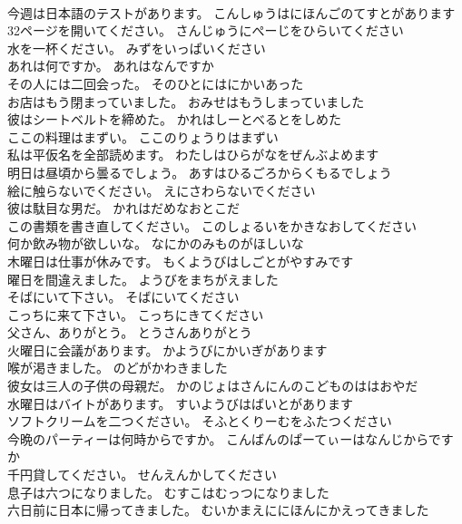 \documentclass[8pt]{extreport}
\begin{document}
\begin{CJK}{UTF8}{min}
\\	今週は日本語のテストがあります。	こんしゅうはにほんごのてすとがあります 
\\	32ページを開いてください。	さんじゅうにぺーじをひらいてください 
\\	水を一杯ください。	みずをいっぱいください 
\\	あれは何ですか。	あれはなんですか 
\\	その人には二回会った。	そのひとにはにかいあった 
\\	お店はもう閉まっていました。	おみせはもうしまっていました 
\\	彼はシートベルトを締めた。	かれはしーとべるとをしめた 
\\	ここの料理はまずい。	ここのりょうりはまずい 
\\	私は平仮名を全部読めます。	わたしはひらがなをぜんぶよめます 
\\	明日は昼頃から曇るでしょう。	あすはひるごろからくもるでしょう 
\\	絵に触らないでください。	えにさわらないでください 
\\	彼は駄目な男だ。	かれはだめなおとこだ 
\\	この書類を書き直してください。	このしょるいをかきなおしてください 
\\	何か飲み物が欲しいな。	なにかのみものがほしいな 
\\	木曜日は仕事が休みです。	もくようびはしごとがやすみです 
\\	曜日を間違えました。	ようびをまちがえました 
\\	そばにいて下さい。	そばにいてください 
\\	こっちに来て下さい。	こっちにきてください 
\\	父さん、ありがとう。	とうさんありがとう 
\\	火曜日に会議があります。	かようびにかいぎがあります 
\\	喉が渇きました。	のどがかわきました 
\\	彼女は三人の子供の母親だ。	かのじょはさんにんのこどものははおやだ 
\\	水曜日はバイトがあります。	すいようびはばいとがあります 
\\	ソフトクリームを二つください。	そふとくりーむをふたつください 
\\	今晩のパーティーは何時からですか。	こんばんのぱーてぃーはなんじからですか 
\\	千円貸してください。	せんえんかしてください 
\\	息子は六つになりました。	むすこはむっつになりました 
\\	六日前に日本に帰ってきました。	むいかまえににほんにかえってきました 

\end{CJK}
\end{document}
